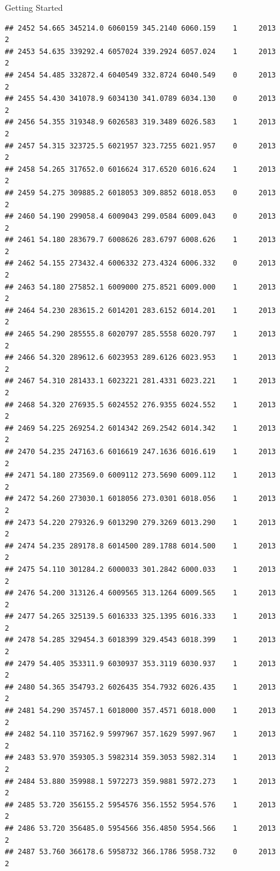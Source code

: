 \documentclass[
  ignorenonframetext,
]{beamer}
\begin{document}
\begin{frame}[fragile]{Getting Started}
\begin{verbatim}
## 2452 54.665 345214.0 6060159 345.2140 6060.159    1     2013        2
## 2453 54.635 339292.4 6057024 339.2924 6057.024    1     2013        2
## 2454 54.485 332872.4 6040549 332.8724 6040.549    0     2013        2
## 2455 54.430 341078.9 6034130 341.0789 6034.130    0     2013        2
## 2456 54.355 319348.9 6026583 319.3489 6026.583    1     2013        2
## 2457 54.315 323725.5 6021957 323.7255 6021.957    0     2013        2
## 2458 54.265 317652.0 6016624 317.6520 6016.624    1     2013        2
## 2459 54.275 309885.2 6018053 309.8852 6018.053    0     2013        2
## 2460 54.190 299058.4 6009043 299.0584 6009.043    0     2013        2
## 2461 54.180 283679.7 6008626 283.6797 6008.626    1     2013        2
## 2462 54.155 273432.4 6006332 273.4324 6006.332    0     2013        2
## 2463 54.180 275852.1 6009000 275.8521 6009.000    1     2013        2
## 2464 54.230 283615.2 6014201 283.6152 6014.201    1     2013        2
## 2465 54.290 285555.8 6020797 285.5558 6020.797    1     2013        2
## 2466 54.320 289612.6 6023953 289.6126 6023.953    1     2013        2
## 2467 54.310 281433.1 6023221 281.4331 6023.221    1     2013        2
## 2468 54.320 276935.5 6024552 276.9355 6024.552    1     2013        2
## 2469 54.225 269254.2 6014342 269.2542 6014.342    1     2013        2
## 2470 54.235 247163.6 6016619 247.1636 6016.619    1     2013        2
## 2471 54.180 273569.0 6009112 273.5690 6009.112    1     2013        2
## 2472 54.260 273030.1 6018056 273.0301 6018.056    1     2013        2
## 2473 54.220 279326.9 6013290 279.3269 6013.290    1     2013        2
## 2474 54.235 289178.8 6014500 289.1788 6014.500    1     2013        2
## 2475 54.110 301284.2 6000033 301.2842 6000.033    1     2013        2
## 2476 54.200 313126.4 6009565 313.1264 6009.565    1     2013        2
## 2477 54.265 325139.5 6016333 325.1395 6016.333    1     2013        2
## 2478 54.285 329454.3 6018399 329.4543 6018.399    1     2013        2
## 2479 54.405 353311.9 6030937 353.3119 6030.937    1     2013        2
## 2480 54.365 354793.2 6026435 354.7932 6026.435    1     2013        2
## 2481 54.290 357457.1 6018000 357.4571 6018.000    1     2013        2
## 2482 54.110 357162.9 5997967 357.1629 5997.967    1     2013        2
## 2483 53.970 359305.3 5982314 359.3053 5982.314    1     2013        2
## 2484 53.880 359988.1 5972273 359.9881 5972.273    1     2013        2
## 2485 53.720 356155.2 5954576 356.1552 5954.576    1     2013        2
## 2486 53.720 356485.0 5954566 356.4850 5954.566    1     2013        2
## 2487 53.760 366178.6 5958732 366.1786 5958.732    0     2013        2

\end{verbatim}
\end{frame}
\end{document}

